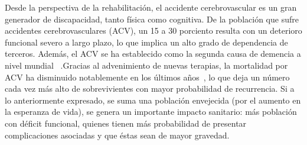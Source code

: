 \begin{introduction}
    Desde la perspectiva de la rehabilitación, el accidente cerebrovascular es un gran generador de discapacidad, tanto física como cognitiva. De la población que sufre accidentes cerebrovasculares (ACV), un 15 a 30 porciento resulta con un deterioro funcional severo a largo plazo, lo que implica un alto grado de dependencia de terceros. Además, el ACV se ha
    establecido como la segunda causa de demencia a nivel mundial~\cite{moyano2010accidente} .Gracias al advenimiento de nuevas terapias, la mortalidad por ACV ha disminuido notablemente en los últimos 
    años~\cite{cuadrado2009rehabilitacion,harold2007guidelines}, lo que deja un número cada vez más alto de sobrevivientes con mayor probabilidad de recurrencia. Si a lo anteriormente expresado, se suma una población envejecida (por el aumento en la esperanza de vida), se genera un importante impacto sanitario: más población con déficit funcional, quienes tienen más probabilidad de presentar complicaciones asociadas y que éstas sean de mayor gravedad.


\end{introduction}
